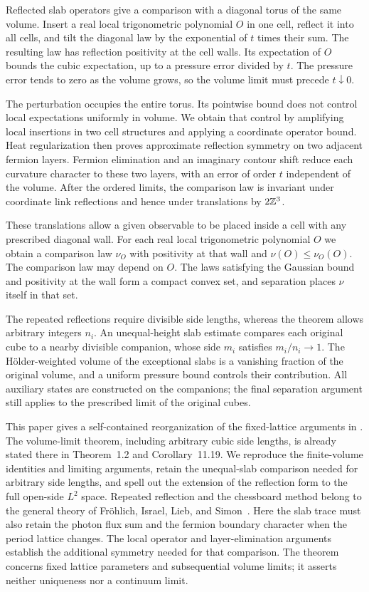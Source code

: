 Reflected slab operators give a comparison with a diagonal torus
of the same volume. Insert a real local trigonometric polynomial
$O$ in one cell, reflect it into all cells, and tilt the diagonal
law by the exponential of $t$ times their sum. The resulting law
has reflection positivity at the cell walls. Its expectation of
$O$ bounds the cubic expectation, up to a pressure error divided
by $t$. The pressure error tends to zero as the volume grows, so
the volume limit must precede $t\downarrow0$.

The perturbation occupies the entire torus. Its pointwise bound
does not control local expectations uniformly in volume. We obtain
that control by amplifying local insertions in two cell structures
and applying a coordinate operator bound. Heat regularization then
proves approximate reflection symmetry on two adjacent fermion
layers. Fermion elimination and an imaginary contour shift reduce
each curvature character to these two layers, with an error of
order $t$ independent of the volume. After the ordered limits,
the comparison law is invariant under coordinate link reflections
and hence under translations by $2\mathbb Z^3$.

These translations allow a given observable to be placed inside a
cell with any prescribed diagonal wall. For each real local
trigonometric polynomial $O$ we obtain a comparison law $\nu_O$
with positivity at that wall and
$\nu(O)\le\nu_O(O)$. The comparison law may depend on $O$.
The laws satisfying the Gaussian bound and positivity at the wall
form a compact convex set, and separation places $\nu$ itself in
that set.

The repeated reflections require divisible side lengths, whereas
the theorem allows arbitrary integers $n_i$. An unequal-height
slab estimate compares each original cube to a nearby divisible
companion, whose side $m_i$ satisfies $m_i/n_i\to1$. The H\"older-weighted
volume of the exceptional slabs is a vanishing fraction of the original
volume, and a uniform pressure bound controls their contribution. All auxiliary states
are constructed on the companions; the final separation argument
still applies to the prescribed limit of the original cubes.


This paper gives a self-contained reorganization of the fixed-lattice
arguments in \cite[Sections~3--11]{ChamberQED}. The volume-limit
theorem, including arbitrary cubic side lengths, is already stated
there in Theorem~1.2 and Corollary~11.19. We reproduce the finite-volume
identities and limiting arguments, retain the unequal-slab comparison
needed for arbitrary side lengths, and spell out the extension of the
reflection form to the full open-side $L^2$ space. Repeated reflection and the
chessboard method belong to the general theory of Fr\"ohlich, Israel,
Lieb, and Simon~\cite[Section~4]{FILS1978}. Here the slab trace must also
retain the photon flux sum and the fermion boundary character when
the period lattice changes. The local operator and layer-elimination
arguments establish the additional symmetry needed for that comparison.
The theorem concerns fixed lattice parameters and subsequential volume
limits; it asserts neither uniqueness nor a continuum limit.
